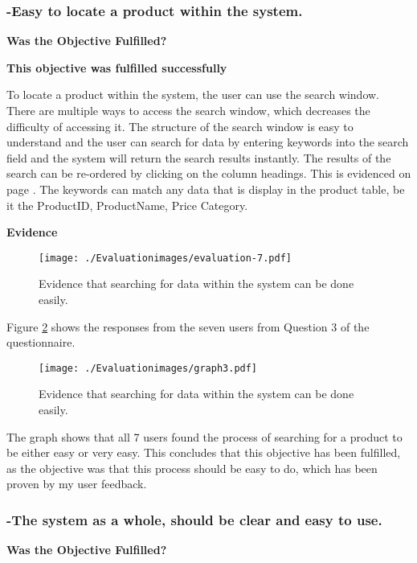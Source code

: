 \subsubsection{-Easy to locate a product within the system.}
\textbf{Was the Objective Fulfilled?} \newline

\textbf{\large{This objective was fulfilled successfully}}

To locate a product within the system, the user can use the search window. There are multiple ways to access the search window, which decreases the difficulty of accessing it. The structure of the search window is easy to understand and the user can search for data by entering keywords into the search field and the system will return the search results instantly. The results of the search can be re-ordered by clicking on the column headings. This is evidenced on page \pageref{}. The keywords can match any data that is display in the product table, be it the ProductID, ProductName, Price Category.\newline

\textbf{Evidence} \newline

\begin{figure}[H]
\caption{Evidence that searching for data within the system can be done easily.} \label{fig:evaluation-7}
\hfill\texttt{[image: ./Evaluationimages/evaluation-7.pdf]}
\end{figure}

\pagebreak

Figure \ref{graph3} shows the responses from the seven users from Question 3 of the questionnaire.

\begin{figure}[H]
\caption{Evidence that searching for data within the system can be done easily.} \label{graph3}
\hfill\texttt{[image: ./Evaluationimages/graph3.pdf]}
\end{figure}

The graph shows that all 7 users found the process of searching for a product to be either easy or very easy. This concludes that this objective has been fulfilled, as the objective was that this process should be easy to do, which has been proven by my user feedback.


\pagebreak
\subsubsection{-The system as a whole, should be clear and easy to use.}
\textbf{Was the Objective Fulfilled?} \newline

